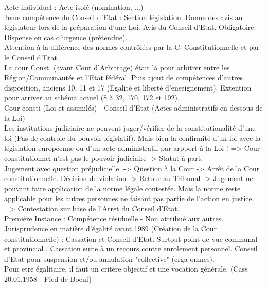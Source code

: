 \documentclass{book}
\begin{document}
Acte individuel : Acte isolé (nomination, ...)\\

2eme compétence du Conseil d'Etat : Section législation. Donne des avis au législateur lors de la préparation d'une Loi. Avis du Conseil d'Etat. Obligatoire. Dispense en cas d'urgence (prétendue).\\

Attention à la différence des normes contrôlées par la C. Constitutionnelle et par le Conseil d'Etat.\\

La cour Const. (avant Cour d'Arbitrage) était là pour arbitrer entre les Région/Communautés et l'Etat fédéral. Puis ajout de compétences d'autres disposition, anciens 10, 11 et 17 (Egalité et liberté d'enseignement). Extention pour arriver au schéma actuel (8 à 32, 170, 172 et 192).\\

Cour consti (Loi et assimilés) - Conseil d'Etat (Actes administratifs en dessous de la Loi)\\

Les institutions judiciaire ne peuvent juger/vérifier de la constitutionalité d'une loi (Pas de controle du pouvoir législatif). Mais bien la confirmité d'un loi avec la législation européenne ou d'un acte administratif par arpport à la Loi ! => Cour constitutionnel n'est pas le pouvoir judiciaire -> Statut à part.\\

Jugement avec question préjudicielle. -> Question à la Cour -> Arrêt de la Cour constitutionnelle. Décision de violation -> Retour au Tribunal -> Jugement ne pouvant faire application de la norme légale contestée. Mais la norme reste applicable pour les autres personnes ne faisant pas partie de l'action en justice. => Contestation sur base de l'Arret du Conseil d'Etat. \\

Première Instance : Compétence résiduelle - Non attribué aux autres.\\

Jurisprudence en matière d'égalité avant 1989 (Création de la Cour constitutionnelle) : Cassation et Conseil d'Etat. Surtout point de vue communal et provincial . Cassation suite à un recours contre enrolement personnel. Conseil d'Etat pour suspension et/ou annulation "collective" (erga omnes).\\

Pour etre égalitaire, il faut un critère objectif et une vocation générale. (Cass 20.01.1958 - Pied-de-Boeuf)\\
\end{document}
